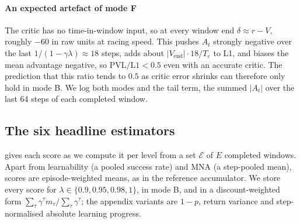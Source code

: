 \paragraph{An expected artefact of mode F} The critic has no time-in-window input, so at
every window end $\delta \approx r - V$, roughly $-60$ in raw units at racing speed. This
pushes $A_t$ strongly negative over the last $1/(1-\gamma\lambda) \approx 18$ steps, adds
about $|V_{\text{end}}| \cdot 18 / T_e$ to L1, and biases the mean advantage negative, so
$\mathrm{PVL}/\mathrm{L1} < 0.5$ even with an accurate critic. The prediction that this
ratio tends to $0.5$ as critic error shrinks can therefore only hold in mode B. We log
both modes and the tail term, the summed $|A_t|$ over the last 64 steps of each completed
window.

\subsection{The six headline estimators}
\label{sec:est-six}

 gives each score as we compute it per level from a set $\mathcal E$
of $E$ completed windows. Apart from learnability (a pooled success rate) and MNA (a
step-pooled mean), scores are episode-weighted means, as in the reference accumulator. We store every score for $\lambda \in \{0.9, 0.95, 0.98, 1\}$, in mode B, and
in a discount-weighted form $\sum_\tau \gamma^\tau m_\tau / \sum_\tau \gamma^\tau$; the
appendix variants are $1-p$, return variance and step-normalised absolute learning
progress.

